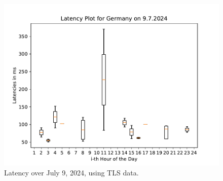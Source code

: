 \begin{figure}
	\includegraphics[width=\textwidth]{./chapters/appendix/img/latency_plot_for_germany_on_9.7.2024.pdf}
	\caption{Latency over July 9, 2024, using TLS data.}
	\label{fig:tls-analysis-individual-day}
\end{figure}

